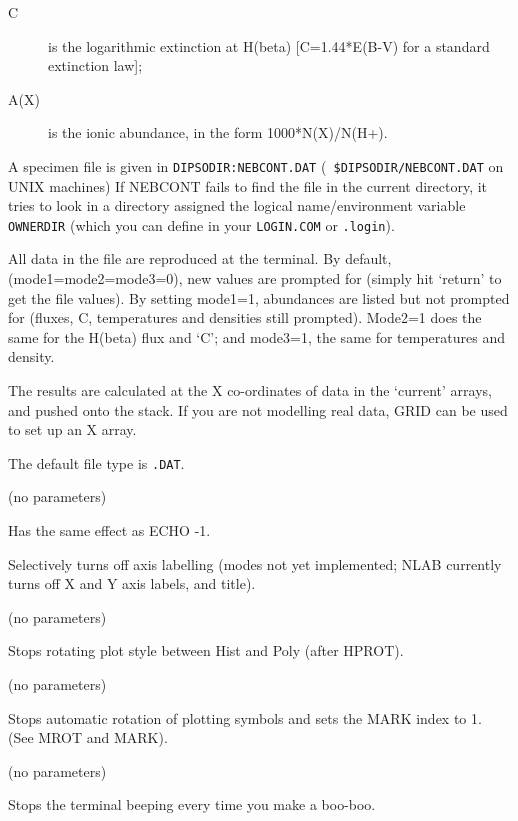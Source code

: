 \begin {description}
\begin{description}
\begin{description}
\item [C] is the logarithmic extinction at H(beta) [C=1.44*E(B-V) for
a standard extinction law];

\item [A(X)] is the ionic abundance, in the form 1000*N(X)/N(H+).

\end{description}
\end{description}

A specimen file is given in {\tt DIPSODIR:NEBCONT.DAT} ({\tt
\$DIPSODIR/NEBCONT.DAT} on UNIX machines) If NEBCONT fails to find the
file in the current directory, it tries to look in a directory
assigned the logical name/environment variable {\tt OWNERDIR} (which
you can define in your {\tt LOGIN.COM} or {\tt .login}).

All data in the file are reproduced at the terminal. By default,
(mode1=mode2=mode3=0), new values are prompted for (simply hit
`return' to get the file values). By setting mode1=1, abundances are
listed but not prompted for (fluxes, C, temperatures and densities
still prompted). Mode2=1 does the same for the H(beta) flux and `C';
and mode3=1, the same for temperatures and density.

The results are calculated at the X co-ordinates of data in the
`current' arrays, and pushed onto the stack. If you are not modelling
real data, GRID can be used to set up an X array.

The default file type is {\tt .DAT}.

\item [NECHO] (no parameters)

Has the same effect as ECHO -1.

\item [NLAB] [mode]

Selectively turns off axis labelling (modes not yet implemented;
NLAB currently turns off X and Y axis labels, and title).

\item [NHPROT] (no parameters)

Stops rotating plot style between Hist and Poly (after HPROT).

\item [NMROT] (no parameters)

Stops automatic rotation of plotting symbols and sets the MARK index to 1.
(See MROT and MARK).

\item [NOBEEP] (no parameters)

Stops the terminal beeping every time you make a boo-boo.


\end{description}
